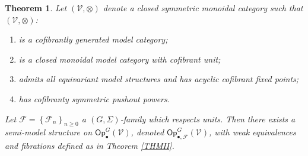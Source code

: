 \documentclass[a4paper,10pt
,draft
]{article}%
\numberwithin{equation}{section}
\numberwithin{figure}{section}
\newtheorem{theorem}[equation]{Theorem}%
\theoremstyle{definition} %
\newcommand{\set}[1]{\left\{#1\right\}}%
\newcommand{\Op}{\mathsf{Op}}%
\newcommand{\F}{\ensuremath{\mathcal F}}
\newcommand{\V}{\ensuremath{\mathcal V}}
\renewcommand{\O}{\ensuremath{\mathcal O}}
\newcommand{\1}{\ensuremath{\mathbbm 1}}%
\begin{document}
\begin{theorem}
      \label{THMII_S}
      Let $(\V,\otimes)$ denote a closed symmetric monoidal category such that
      $(\V, \otimes)$:
      \begin{enumerate}[label = (\roman*)]
      \item is a cofibrantly generated model category;
      \item is a closed monoidal model category with cofibrant unit;
      \item admits all equivariant model structures and has acyclic cofibrant fixed points;
      \item has cofibranty symmetric pushout powers.
      \end{enumerate}
      
      Let $\F = \set{\F_n}_{n \geq 0}$ a $(G, \Sigma)$-family which respects units.
      Then there exists a semi-model structure on $\Op^G_\bullet(\V)$, denoted $\Op^G_{\bullet,\F}(\V)$,
      with weak equivalences and fibrations defined as in Theorem \ref{THMII}.
\end{theorem}


























\newpage
{}

\end{document}

